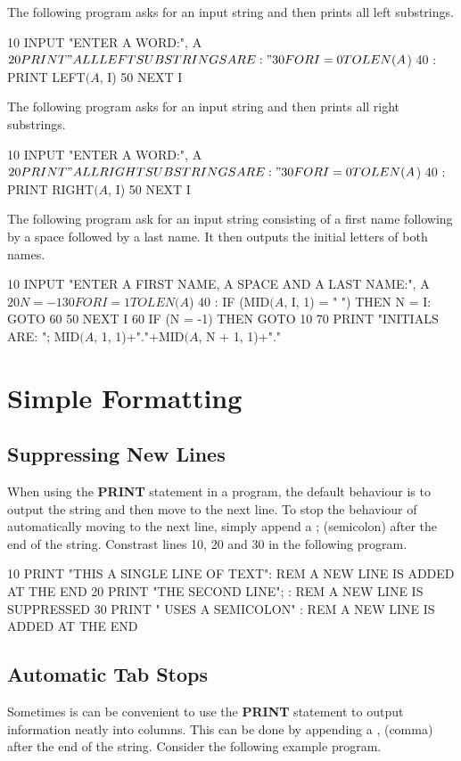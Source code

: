 The following program asks for an input string and then prints all left substrings.
\begin{screenoutput}
10 INPUT "ENTER A WORD:", A$
20 PRINT "ALL LEFT SUBSTRINGS ARE:"
30 FOR I = 0 TO LEN(A$) 
40 :  PRINT LEFT$(A$, I)
50 NEXT I
\end{screenoutput}

The following program asks for an input string and then prints all right substrings.
\begin{screenoutput}
10 INPUT "ENTER A WORD:", A$
20 PRINT "ALL RIGHT SUBSTRINGS ARE:"
30 FOR I = 0 TO LEN(A$)
40 :  PRINT RIGHT$(A$, I)
50 NEXT I
\end{screenoutput}

The following program ask for an input string consisting of a first name following by a space followed by a last name. It then outputs the initial letters of both names.
\begin{screenoutput}
10 INPUT "ENTER A FIRST NAME, A SPACE AND A LAST NAME:", A$
20 N = -1
30 FOR I = 1 TO LEN(A$)
40 :  IF (MID$(A$, I, 1) = " ") THEN N = I: GOTO 60
50 NEXT I
60 IF (N = -1) THEN GOTO 10
70 PRINT "INITIALS ARE: "; MID$(A$, 1, 1)+"."+MID$(A$, N + 1, 1)+"."
\end{screenoutput}

\section{Simple Formatting}

\subsection{Suppressing New Lines}
When using the {\bf PRINT} statement in a program, the default behaviour is to output the string and then move to the next line. To stop the behaviour of automatically moving to the next line, simply append a ; (semicolon) after the end of the string. Constrast lines 10, 20 and 30 in the following program.

\begin{screenoutput}
10 PRINT "THIS A SINGLE LINE OF TEXT": REM A NEW LINE IS ADDED AT THE END 
20 PRINT "THE SECOND LINE"; : REM A NEW LINE IS SUPPRESSED
30 PRINT " USES A SEMICOLON" : REM A NEW LINE IS ADDED AT THE END
\end{screenoutput}

\subsection{Automatic Tab Stops}
Sometimes is can be convenient to use the {\bf PRINT} statement to output information neatly into columns. This can be done by appending a , (comma) after the end of the string. Consider the following example program.

